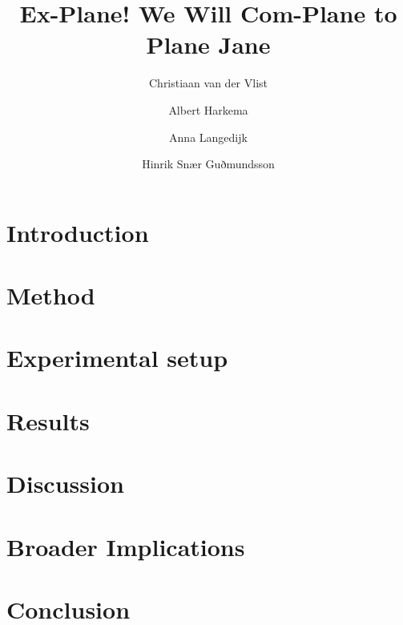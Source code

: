 \documentclass[sigconf,authordraft]{acmart}
\begin{document}
\title{Ex-Plane! We Will Com-Plane to Plane Jane}
\author{Christiaan van der Vlist}
\affiliation{%
}

\author{Albert Harkema}
\affiliation{%
  \institution{}
  \country{}}

\author{Anna Langedijk}
\affiliation{%
  \institution{}
  \country{}
}

\author{Hinrik Snær Guðmundsson}
\affiliation{%
 \institution{}
 \country{}}
\renewcommand{\shortauthors}{van der Vlist, et al.}

\begin{abstract}


\end{abstract}


\maketitle

\section{Introduction}


\section{Method}


\section{Experimental setup}


\section{Results}


\section{Discussion}


\section{Broader Implications}


\section{Conclusion}




\end{document}
